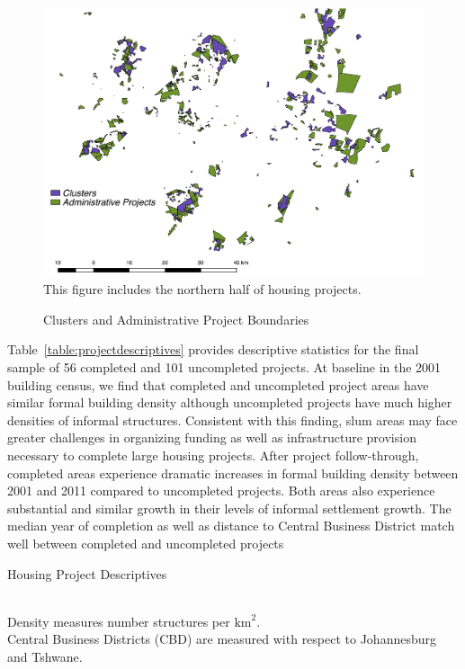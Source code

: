 \documentclass[12pt]{article}
\begin{document}
\begin{figure}
\caption{Clusters and Administrative Project Boundaries}\label{figure:gcrooverlap}
\centering
\includegraphics[scale=.5]{figures/gcro_convexhull_overlap.pdf} \\
This figure includes the northern half of housing projects.
\end{figure}

Table~\ref{table:projectdescriptives} provides descriptive statistics for the final sample of 56 completed and 101 uncompleted projects.  At baseline in the 2001 building census, we find that completed and uncompleted project areas have similar formal building density although uncompleted projects have much higher densities of informal structures.  Consistent with this finding, slum areas may face greater challenges in organizing funding as well as infrastructure provision necessary to complete large housing projects.  After project follow-through, completed areas experience dramatic increases in formal building density between 2001 and 2011 compared to uncompleted projects.  Both areas also experience substantial and similar growth in their levels of informal settlement growth.  The median year of completion as well as distance to Central Business District match well between completed and uncompleted projects 

\begin{table}
	\centering
	\caption{Housing Project Descriptives}\label{table:projectdescriptives}
\\
Density measures number structures per $\text{km}^2$. \\  Central Business Districts (CBD) are measured with respect to Johannesburg and Tshwane.
\end{table}
\end{document}
